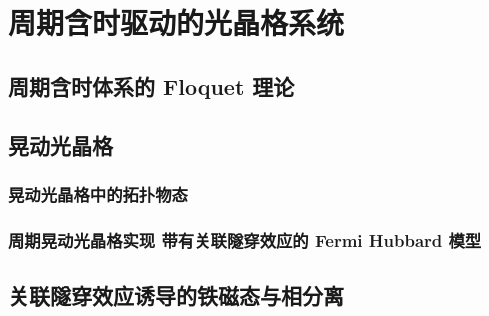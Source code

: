 \chapter{周期含时驱动的光晶格系统}


\section{周期含时体系的 Floquet 理论}


\section{晃动光晶格}


\subsection{晃动光晶格中的拓扑物态}


\subsection{周期晃动光晶格实现 带有关联隧穿效应的 Fermi Hubbard 模型}


\section{关联隧穿效应诱导的铁磁态与相分离}